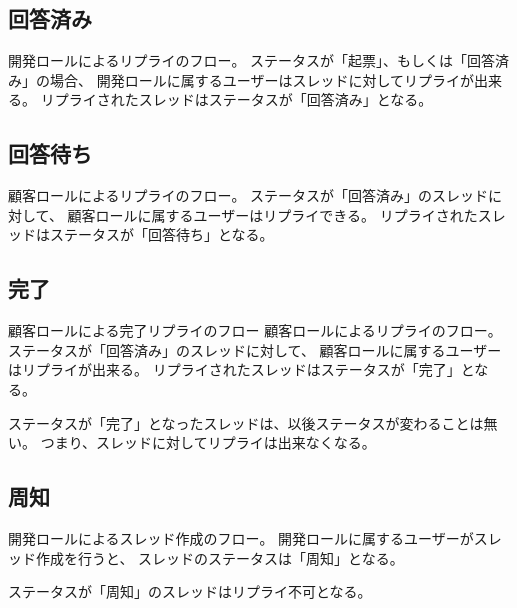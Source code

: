         \subsection{回答済み}
            開発ロールによるリプライのフロー。
            ステータスが「起票」、もしくは「回答済み」の場合、
            開発ロールに属するユーザーはスレッドに対してリプライが出来る。
            リプライされたスレッドはステータスが「回答済み」となる。

        \subsection{回答待ち}
            顧客ロールによるリプライのフロー。
            ステータスが「回答済み」のスレッドに対して、
            顧客ロールに属するユーザーはリプライできる。
            リプライされたスレッドはステータスが「回答待ち」となる。

        \subsection{完了}
            顧客ロールによる完了リプライのフロー
            顧客ロールによるリプライのフロー。
            ステータスが「回答済み」のスレッドに対して、
            顧客ロールに属するユーザーはリプライが出来る。
            リプライされたスレッドはステータスが「完了」となる。

            ステータスが「完了」となったスレッドは、以後ステータスが変わることは無い。
            つまり、スレッドに対してリプライは出来なくなる。

        \subsection{周知}
            開発ロールによるスレッド作成のフロー。
            開発ロールに属するユーザーがスレッド作成を行うと、
            スレッドのステータスは「周知」となる。

            ステータスが「周知」のスレッドはリプライ不可となる。


